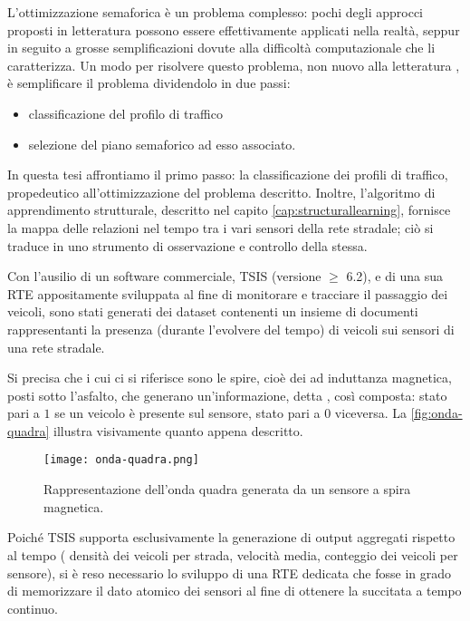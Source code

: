 L'ottimizzazione semaforica è un problema complesso: pochi degli approcci proposti in letteratura \citep{Park1998,Gershenson2008,Thorpe1996,Felici2006} possono essere effettivamente applicati nella realtà, seppur in seguito a grosse semplificazioni dovute alla difficoltà computazionale che li caratterizza. Un modo per risolvere questo problema, non nuovo alla letteratura \citep[si veda][]{Angulo2011}, è semplificare il problema dividendolo in due passi:
\begin{itemize}
    \item classificazione del profilo di traffico
    \item selezione del piano semaforico ad esso associato.
\end{itemize}
In questa tesi affrontiamo il primo passo: la classificazione dei profili di traffico, propedeutico all'ottimizzazione del problema descritto. Inoltre, l'algoritmo di apprendimento strutturale, descritto nel capito \vref{cap:structurallearning}, fornisce la mappa delle relazioni nel tempo tra i vari sensori della rete stradale; ciò si traduce in uno strumento di osservazione e controllo della stessa.

Con l'ausilio di un software commerciale, \acf{TSIS} (versione $\geq$ 6.2), e di una sua \acl{RTE} appositamente sviluppata al fine di monitorare e tracciare il passaggio dei veicoli, sono stati generati dei dataset contenenti un insieme di documenti rappresentanti la presenza (durante l'evolvere del tempo) di veicoli sui sensori di una rete stradale.

Si precisa che i  cui ci si riferisce sono le spire, cioè dei  ad induttanza magnetica, posti sotto l'asfalto, che generano un'informazione, detta , così composta: stato pari a $1$ se un veicolo è presente sul sensore, stato pari a $0$ viceversa. La \vref{fig:onda-quadra} illustra visivamente quanto appena descritto.
\begin{figure}[htbp]
    \centering
    \texttt{[image: onda-quadra.png]}
    \caption[Onda quadra]{Rappresentazione dell'onda quadra generata da un sensore a spira magnetica.}
    \label{fig:onda-quadra}
\end{figure}

Poiché \acs{TSIS} supporta esclusivamente la generazione di output aggregati rispetto al tempo (\eg{} densità dei veicoli per strada, velocità media, conteggio dei veicoli per sensore), si è reso necessario lo sviluppo di una \acl{RTE} dedicata che fosse in grado di memorizzare il dato atomico dei sensori al fine di ottenere la succitata  a tempo continuo.


